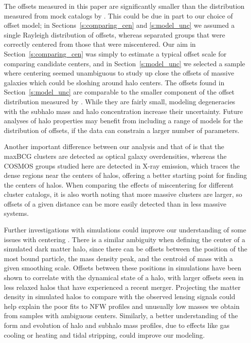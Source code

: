 \documentclass[12pt]{emulateapj}
\begin{document}
The offsets measured in this paper are significantly smaller than the
distribution measured from mock catalogs by
\citet{Johnston2007b}. This could be due in part to our choice of
offset model; in Sections~\ref{s:comparing_cen} and \ref{s:model_unc}
we assumed a single Rayleigh distribution of offsets, whereas
\citeauthor{Johnston2007b} separated groups that were correctly
centered from those that were miscentered. Our aim in
Section~\ref{s:comparing_cen} was simply to estimate a typical offset
scale for comparing candidate centers, and in
Section~\ref{s:model_unc} we selected a sample where centering seemed
unambiguous to study up close the offsets of massive galaxies which
could be sloshing around halo centers. The offsets found in
Section~\ref{s:model_unc} are comparable to the smaller component of
the offset distribution measured by \citet{Oguri2010}. While they
are fairly small, modeling degeneracies with the subhalo mass and halo
concentration increase their uncertainty. Future analyses of halo
properties may benefit from including a range of models for the
distribution of offsets, if the data can constrain a larger number of
parameters.

Another important difference between our analysis and that of
\citeauthor{Johnston2007b} is that the maxBCG clusters are detected as
optical galaxy overdensities, whereas the COSMOS groups studied here
are detected in X-ray emission, which traces the dense regions near
the centers of halos, offering a better starting point for finding the
centers of halos. When comparing the effects of miscentering for
different cluster catalogs, it is also worth noting that more massive
clusters are larger, so offsets of a given distance can be more easily
detected than in less massive systems.

Further investigations with simulations could improve our understanding of some issues
with centering \citep[e.g.,][]{Maccio2007, Neto2007, Hilbert2010, Behroozi2011,
  Dietrich2012, Power2012}. There is a similar ambiguity when defining
the center of a simulated dark matter halo, since there can be offsets
between the position of the most bound particle, the mass density
peak, and the centroid of mass with a given smoothing scale. Offsets
between these positions in simulations have been shown to correlate
with the dynamical state of a halo, with larger offsets seen in less
relaxed halos that have experienced a recent merger. Projecting the
matter density in simulated halos to compare with the observed lensing
signals could help explain the poor fits to NFW profiles and unusually
low masses we obtain from samples with ambiguous centers. Similarly, a
better understanding of the form and evolution of halo and subhalo mass
profiles, due to effects like gas cooling or heating and tidal
stripping, could improve our modeling.
\end{document}
